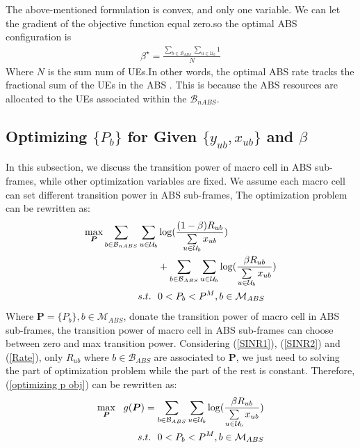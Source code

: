 \documentclass[journal]{IEEETran}
\begin{document}
The above-mentioned formulation is convex, and only one variable. We can let the gradient of the objective function equal zero.so the optimal ABS configuration is
\begin{align}
    \beta^\star = \frac{\sum\limits_{b \in \mathcal{B}_{ABS}} \sum\limits_{u \in \mathcal{U}_b} 1}{N}
\end{align}
Where $N$ is the sum num of UEs.In other words, the optimal ABS rate tracks the fractional sum of the UEs in the ABS
. This is because the ABS resources are allocated to the UEs associated within the $\mathcal{B}_{nABS}$.

\subsection{Optimizing $\{ P_b \}$ for Given $\{ y_{ub}, x_{ub} \}$ and $\beta$ }\label{optimizing p}
In this subsection, we discuss the transition power of macro cell in ABS sub-frames, while other optimization variables are fixed. We assume each macro cell can set different transition power in ABS sub-frames, The optimization problem can be rewritten as:
\begin{align} \label{optimizing p obj}
  \max_{\bm{P}} \sum_{b \in \mathcal{B}_{nABS}} \sum_{u \in \mathcal{U}_b} & \log(\frac{ (1 - \beta)R_{ub} }{ \sum\limits_{u \in \mathcal{U}_b} x_{ub}}) \notag\\
  &+ \sum_{b \in \mathcal{B}_{ABS}} \sum_{u \in \mathcal{U}_b} \log(\frac{ \beta R_{ub} }{ \sum\limits_{u \in \mathcal{U}_b} x_{ub}}) \\
  s.t.~~& 0 < P_b < P^{M}, b \in \mathcal{M}_{ABS} \notag
\end{align}
Where $\bm{P} = \{P_b\}, b \in \mathcal{M}_{ABS}$, donate the transition power of macro cell in ABS sub-frames, the transition power of macro cell in ABS sub-frames can choose between zero and max transition power. Considering (\ref{SINR1}), (\ref{SINR2}) and (\ref{Rate}), only ${R_{ub}}$ where $b \in \mathcal{B}_{ABS}$ are associated to $\bm{P}$, we just need to solving the part of optimization problem while the part of the rest is constant. Therefore, (\ref{optimizing p obj}) can be rewritten as:
\begin{align} \label{optimizing p g}
 \max_{\bm{P}}~~g(\bm{P}) = \sum_{b \in \mathcal{B}_{ABS}} \sum_{u \in \mathcal{U}_b} \log(\frac{ \beta R_{ub} }{ \sum\limits_{u \in \mathcal{U}_b} x_{ub}}) \\
 s.t.~~0 < P_b < P^{M}, b \in \mathcal{M}_{ABS} \notag
\end{align}
\end{document}
